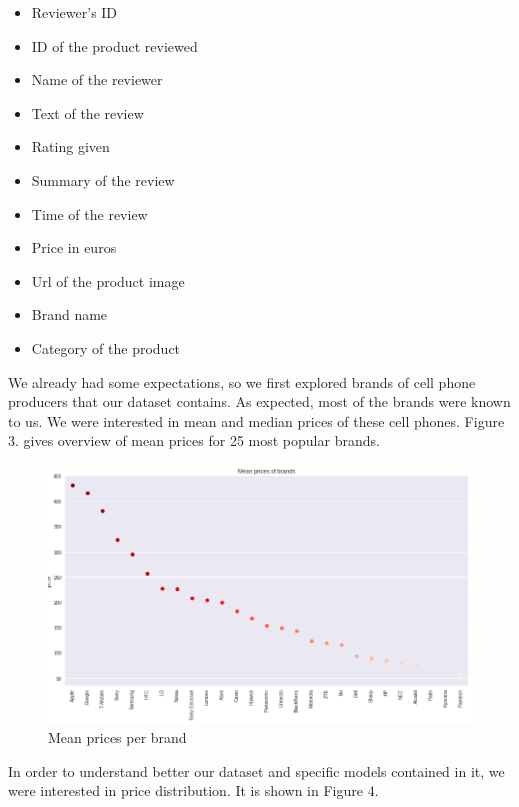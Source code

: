 \documentclass[11pt]{article}
\begin{document}
\begin{itemize}
  \item Reviewer's ID
  \item ID of the product reviewed
  \item Name of the reviewer
  \item Text of the review
  \item Rating given
  \item Summary of the review
  \item Time of the review
  \item Price in euros
  \item Url of the product image
  \item Brand name
  \item Category of the product
\end{itemize}

We already had some expectations, so we first explored brands of cell phone producers that our dataset contains. As expected, most of the brands were known to us. We were interested in mean and median prices of these cell phones. Figure 3. gives overview of mean prices for 25 most popular brands.   

\begin{figure}[h!]
  \centering
    \includegraphics[width=\linewidth]{meanPrices.png}
  \caption{Mean prices per brand}
  \label{fig:meanPricePerBrand}
\end{figure}

In order to understand better our dataset and specific models contained in it, we were interested in price distribution. It is shown in Figure 4. 
\end{document}
